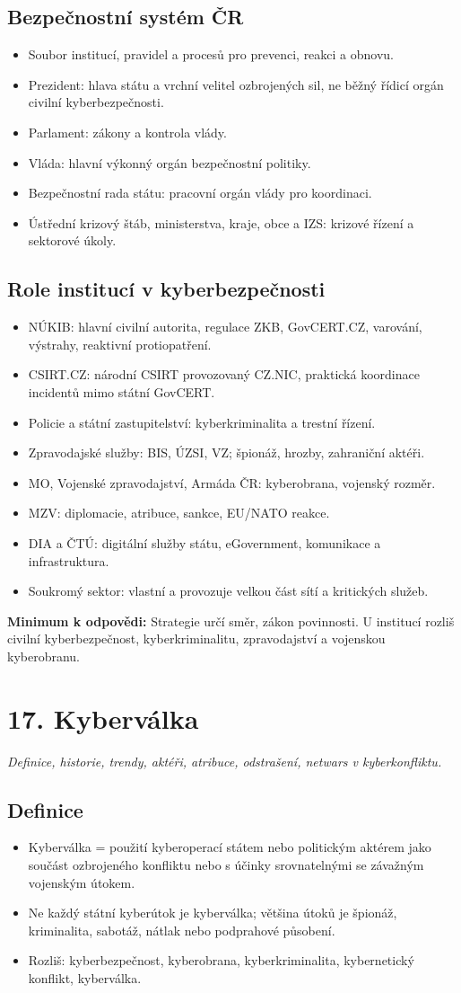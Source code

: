 \documentclass[10pt,a4paper]{article}
\newcommand{\otazka}[2]{\section*{#1}\addcontentsline{toc}{section}{#1}\textit{#2}\par\medskip}
\newcommand{\must}[1]{\colorbox{blue!7}{\parbox{\dimexpr\linewidth-2\fboxsep}{\textbf{Minimum k odpovědi:} #1}}\par\medskip}
\newcommand{\blok}[1]{\subsection*{#1}}
\begin{document}
\blok{Bezpečnostní systém ČR}
\begin{itemize}
  \item Soubor institucí, pravidel a procesů pro prevenci, reakci a obnovu.
  \item Prezident: hlava státu a vrchní velitel ozbrojených sil, ne běžný řídicí orgán civilní kyberbezpečnosti.
  \item Parlament: zákony a kontrola vlády.
  \item Vláda: hlavní výkonný orgán bezpečnostní politiky.
  \item Bezpečnostní rada státu: pracovní orgán vlády pro koordinaci.
  \item Ústřední krizový štáb, ministerstva, kraje, obce a IZS: krizové řízení a sektorové úkoly.
\end{itemize}

\blok{Role institucí v kyberbezpečnosti}
\begin{itemize}
  \item NÚKIB: hlavní civilní autorita, regulace ZKB, GovCERT.CZ, varování, výstrahy, reaktivní protiopatření.
  \item CSIRT.CZ: národní CSIRT provozovaný CZ.NIC, praktická koordinace incidentů mimo státní GovCERT.
  \item Policie a státní zastupitelství: kyberkriminalita a trestní řízení.
  \item Zpravodajské služby: BIS, ÚZSI, VZ; špionáž, hrozby, zahraniční aktéři.
  \item MO, Vojenské zpravodajství, Armáda ČR: kyberobrana, vojenský rozměr.
  \item MZV: diplomacie, atribuce, sankce, EU/NATO reakce.
  \item DIA a ČTÚ: digitální služby státu, eGovernment, komunikace a infrastruktura.
  \item Soukromý sektor: vlastní a provozuje velkou část sítí a kritických služeb.
\end{itemize}

\must{Strategie určí směr, zákon povinnosti. U institucí rozliš civilní kyberbezpečnost, kyberkriminalitu, zpravodajství a vojenskou kyberobranu.}

\newpage

\otazka{17. Kyberválka}{Definice, historie, trendy, aktéři, atribuce, odstrašení, netwars v kyberkonfliktu.}

\blok{Definice}
\begin{itemize}
  \item Kyberválka = použití kyberoperací státem nebo politickým aktérem jako součást ozbrojeného konfliktu nebo s účinky srovnatelnými se závažným vojenským útokem.
  \item Ne každý státní kyberútok je kyberválka; většina útoků je špionáž, kriminalita, sabotáž, nátlak nebo podprahové působení.
  \item Rozliš: kyberbezpečnost, kyberobrana, kyberkriminalita, kybernetický konflikt, kyberválka.
\end{itemize}
\end{document}
